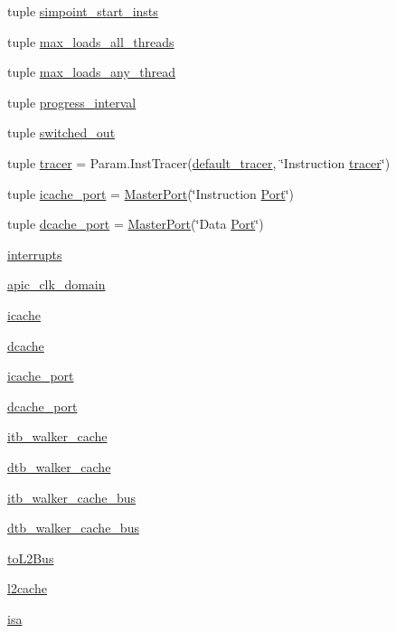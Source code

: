 \begin{DoxyCompactItemize}
tuple \hyperlink{classBaseCPU_a30fe1902651549f6e2fe15e9e1431614}{simpoint\_\-start\_\-insts}
\item 
tuple \hyperlink{classBaseCPU_a1ae95047fbaf997fcce9b1fce56e33c8}{max\_\-loads\_\-all\_\-threads}
\item 
tuple \hyperlink{classBaseCPU_af0e664a8b890f123dd471b9d8f16aa69}{max\_\-loads\_\-any\_\-thread}
\item 
tuple \hyperlink{classBaseCPU_a1446cbc3c813038b4583bfa7ee8cab43}{progress\_\-interval}
\item 
tuple \hyperlink{classBaseCPU_a121f751814e1a758b12f22303623a3f2}{switched\_\-out}
\item 
tuple \hyperlink{classBaseCPU_a7deba7e62c47a4cf4b9f5516fad8b175}{tracer} = Param.InstTracer(\hyperlink{classBaseCPU_aaed212049a9dd45ea37d46403a76713a}{default\_\-tracer}, \char`\"{}Instruction \hyperlink{classBaseCPU_a7deba7e62c47a4cf4b9f5516fad8b175}{tracer}\char`\"{})
\item 
tuple \hyperlink{classBaseCPU_ada744b98d4371502b5cb7c4f036f1344}{icache\_\-port} = \hyperlink{classMasterPort}{MasterPort}(\char`\"{}Instruction \hyperlink{classPort}{Port}\char`\"{})
\item 
tuple \hyperlink{classBaseCPU_a9c199cadc0aca1c84868beea5d4402e7}{dcache\_\-port} = \hyperlink{classMasterPort}{MasterPort}(\char`\"{}Data \hyperlink{classPort}{Port}\char`\"{})
\item 
\hyperlink{classBaseCPU_afb28c1e93e4392feb92bba3a13860de6}{interrupts}
\item 
\hyperlink{classBaseCPU_a91279baac0a912d72511088f03022a74}{apic\_\-clk\_\-domain}
\item 
\hyperlink{classBaseCPU_a6a2f1113123f35e7b40563253458e1bc}{icache}
\item 
\hyperlink{classBaseCPU_a14fe98d2073e51d9684da721ccee155d}{dcache}
\item 
\hyperlink{classBaseCPU_ae92a283dea4788c5640b1c3714fc358f}{icache\_\-port}
\item 
\hyperlink{classBaseCPU_adc175e76d2117b4ce568744b06f0b7f3}{dcache\_\-port}
\item 
\hyperlink{classBaseCPU_a37c8156fb7e91e4bb9bc8beeb4333d40}{itb\_\-walker\_\-cache}
\item 
\hyperlink{classBaseCPU_a62486d185ddea16fa00d4d02f5c39c98}{dtb\_\-walker\_\-cache}
\item 
\hyperlink{classBaseCPU_ac92952e9e23988d0e47b6c41632f9795}{itb\_\-walker\_\-cache\_\-bus}
\item 
\hyperlink{classBaseCPU_a59d7ecff5cf16aa1030de804e2ce2933}{dtb\_\-walker\_\-cache\_\-bus}
\item 
\hyperlink{classBaseCPU_a93e5e48e5669646bc5b83b93fafe6a22}{toL2Bus}
\item 
\hyperlink{classBaseCPU_a9d82c31af4135d722ed9d50479787e9a}{l2cache}
\item 
\hyperlink{classBaseCPU_a39929ad490826f819b29d55d6a5f1fb3}{isa}
\end{DoxyCompactItemize}

